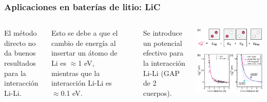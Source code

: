 \documentclass[aspectratio=169]{beamer}
\begin{document}
    \begin{frame}
        \frametitle{Aplicaciones en baterías de litio: LiC}
        
        \begin{columns}
            El método directo no da buenos resultados para la interacción Li-Li.

            Esto se debe a que el cambio de energía al insertar un átomo de Li
            es $\approx$1 eV, mientras que la interacción Li-Li es $\approx$0.1 eV.

            \ \pause 

            Se introduce un potencial efectivo para la interacción Li-Li (GAP de 
            2 cuerpos).

            \begin{center}
                \includegraphics[width=\columnwidth]{LiC-LiLi_efectivo.png}
            \end{center}
        \end{columns}

    \end{frame}
\end{document}
